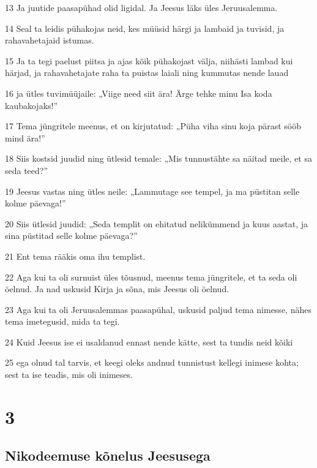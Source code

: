 \par 13 Ja juutide paasapühad olid ligidal. Ja Jeesus läks üles Jeruusalemma.
\par 14 Seal ta leidis pühakojas neid, kes müüsid härgi ja lambaid ja tuvisid, ja rahavahetajaid istumas.
\par 15 Ja ta tegi paelust piitsa ja ajas kõik pühakojast välja, niihästi lambad kui härjad, ja rahavahetajate raha ta puistas laiali ning kummutas nende lauad
\par 16 ja ütles tuvimüüjaile: „Viige need siit ära! Ärge tehke minu Isa koda kaubakojaks!”
\par 17 Tema jüngritele meenus, et on kirjutatud: „Püha viha sinu koja pärast sööb mind ära!”
\par 18 Siis kostsid juudid ning ütlesid temale: „Mis tunnustähte sa näitad meile, et sa seda teed?”
\par 19 Jeesus vastas ning ütles neile: „Lammutage see tempel, ja ma püstitan selle kolme päevaga!”
\par 20 Siis ütlesid juudid: „Seda templit on ehitatud nelikümmend ja kuus aastat, ja sina püstitad selle kolme päevaga?”
\par 21 Ent tema rääkis oma ihu templist.
\par 22 Aga kui ta oli surnuist üles tõusnud, meenus tema jüngritele, et ta seda oli öelnud. Ja nad uskusid Kirja ja sõna, mis Jeesus oli öelnud.
\par 23 Aga kui ta oli Jeruusalemmas paasapühal, uskusid paljud tema nimesse, nähes tema imetegusid, mida ta tegi.
\par 24 Kuid Jeesus ise ei usaldanud ennast nende kätte, sest ta tundis neid kõiki
\par 25 ega olnud tal tarvis, et keegi oleks andnud tunnistust kellegi inimese kohta; sest ta ise teadis, mis oli inimeses.


\chapter{3}

\section*{Nikodeemuse kõnelus Jeesusega}

